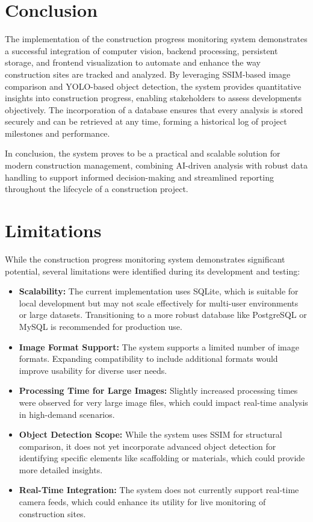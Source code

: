 \documentclass[12pt,a4paper]{report}
\begin{document}
\section{Conclusion}
The implementation of the construction progress monitoring system demonstrates a successful integration of computer vision, backend processing, persistent storage, and frontend visualization to automate and enhance the way construction sites are tracked and analyzed. By leveraging SSIM-based image comparison and YOLO-based object detection, the system provides quantitative insights into construction progress, enabling stakeholders to assess developments objectively. The incorporation of a database ensures that every analysis is stored securely and can be retrieved at any time, forming a historical log of project milestones and performance.

In conclusion, the system proves to be a practical and scalable solution for modern construction management, combining AI-driven analysis with robust data handling to support informed decision-making and streamlined reporting throughout the lifecycle of a construction project.

\section{Limitations}
While the construction progress monitoring system demonstrates significant potential, several limitations were identified during its development and testing:
\begin{itemize}
    \item \textbf{Scalability:} The current implementation uses SQLite, which is suitable for local development but may not scale effectively for multi-user environments or large datasets. Transitioning to a more robust database like PostgreSQL or MySQL is recommended for production use.
    \item \textbf{Image Format Support:} The system supports a limited number of image formats. Expanding compatibility to include additional formats would improve usability for diverse user needs.
    \item \textbf{Processing Time for Large Images:} Slightly increased processing times were observed for very large image files, which could impact real-time analysis in high-demand scenarios.
    \item \textbf{Object Detection Scope:} While the system uses SSIM for structural comparison, it does not yet incorporate advanced object detection for identifying specific elements like scaffolding or materials, which could provide more detailed insights.
    \item \textbf{Real-Time Integration:} The system does not currently support real-time camera feeds, which could enhance its utility for live monitoring of construction sites.
\end{itemize}
\end{document}

